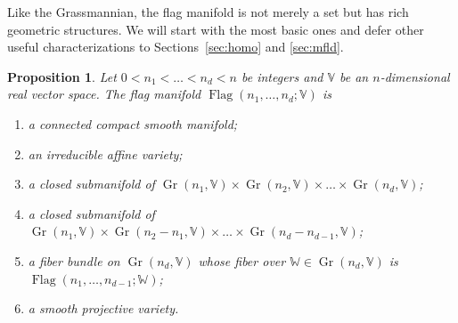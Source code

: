 \documentclass[11pt,reqno]{amsart}%
\newtheorem{proposition}[theorem]{Proposition}
\theoremstyle{definition}
\theoremstyle{remark}
\DeclareMathOperator{\Gr}{Gr}
\DeclareMathOperator{\Flag}{Flag}
\begin{document}
Like the Grassmannian, the flag manifold is not merely a set but has rich geometric structures. We will start with the most basic ones and defer other useful characterizations to Sections~\ref{sec:homo} and \ref{sec:mfld}.
\begin{proposition}\label{prop:geometric structure}
Let $0 < n_1< \dots < n_d < n$ be integers and $\mathbb{V}$ be an $n$-dimensional real vector space. The flag manifold $\Flag(n_1,\dots, n_d;\mathbb{V})$ is
\begin{enumerate}[\upshape (i)]
\item\label{it:mfld} a connected compact smooth manifold;
\item \label{it:var1} an irreducible affine variety;
\item\label{it:cls1} a closed submanifold of $\Gr(n_1,\mathbb{V})\times \Gr(n_2,\mathbb{V}) \times \dots \times \Gr(n_d,\mathbb{V})$;
\item\label{it:cls2} a closed submanifold of $\Gr(n_1,\mathbb{V})\times \Gr(n_2-n_1,\mathbb{V}) \times \dots \times \Gr(n_d-n_{d-1},\mathbb{V}) $;
\item\label{it:fiber} a fiber bundle on $\Gr(n_d,\mathbb{V})$ whose fiber over $\mathbb{W}\in \Gr(n_d,\mathbb{V})$ is $\Flag(n_1,\dots, n_{d-1};\mathbb{W})$;
\item\label{it:var2} a smooth projective variety.
\end{enumerate}
\end{proposition}
\end{document}
